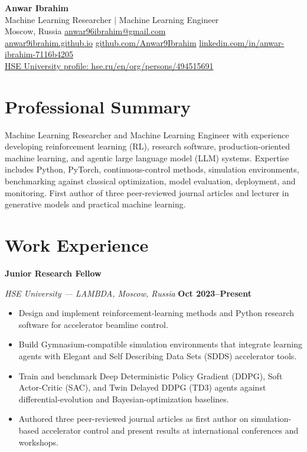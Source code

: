 \documentclass[10pt,a4paper]{article}
\newcommand{\contactsep}{\hspace{0.45em}\textcolor{rule}{\textbullet}\hspace{0.45em}}
\newcommand{\entry}[4]{%
  \textbf{#1}\par
  {\textit{\color{muted}#2\if\relax\detokenize{#3}\relax\else, #3\fi} \textcolor{rule}{\textbar} \textbf{#4}}\par\vspace{-2pt}
}
\begin{document}
\begin{center}
  {\fontsize{24}{28}\selectfont\bfseries\color{navy} Anwar Ibrahim}\\[3pt]
  {\large\color{blue} Machine Learning Researcher $\mid$ Machine Learning Engineer}\\[6pt]
  {\small
    Moscow, Russia \contactsep \href{mailto:anwar96ibrahim@gmail.com}{anwar96ibrahim@gmail.com}\\[2pt]
    \href{https://anwar9ibrahim.github.io/}{anwar9ibrahim.github.io}
    \contactsep \href{https://github.com/Anwar9Ibrahim}{github.com/Anwar9Ibrahim}
    \contactsep \href{https://www.linkedin.com/in/anwar-ibrahim-7116b4205/}{linkedin.com/in/anwar-ibrahim-7116b4205}
  }\\[2pt]
  {\small\href{https://www.hse.ru/en/org/persons/494515691/}{HSE University profile: hse.ru/en/org/persons/494515691}}
\end{center}

\vspace{-3pt}
\section{Professional Summary}
Machine Learning Researcher and Machine Learning Engineer with experience developing reinforcement learning (RL), research software, production-oriented machine learning, and agentic large language model (LLM) systems. Expertise includes Python, PyTorch, continuous-control methods, simulation environments, benchmarking against classical optimization, model evaluation, deployment, and monitoring. First author of three peer-reviewed journal articles and lecturer in generative models and practical machine learning.

\section{Work Experience}

\entry{Junior Research Fellow}{HSE University --- LAMBDA}{Moscow, Russia}{Oct 2023--Present}
\begin{itemize}
  \item Design and implement reinforcement-learning methods and Python research software for accelerator beamline control.
  \item Build Gymnasium-compatible simulation environments that integrate learning agents with Elegant and Self Describing Data Sets (SDDS) accelerator tools.
  \item Train and benchmark Deep Deterministic Policy Gradient (DDPG), Soft Actor-Critic (SAC), and Twin Delayed DDPG (TD3) agents against differential-evolution and Bayesian-optimization baselines.
  \item Authored three peer-reviewed journal articles as first author on simulation-based accelerator control and present results at international conferences and workshops.
\end{itemize}
\end{document}
